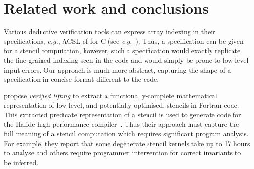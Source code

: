 \documentclass[10pt,preprint]{sigplanconf}
\theoremstyle{definition}
\newcommand{\eg}{\emph{e.g.}}
\begin{document}













\section{Related work and conclusions}
\label{sec:discussion}

Various deductive verification tools can express array indexing
in their specifications, \eg{}, ACSL of \citet{baudin2008acsl}
for C (see \eg{}~\citet[Example 3.4.1]{burghardt2010acsl}). Thus, a specification
can be given for a stencil computation, 
however, such a specification would exactly replicate the fine-grained
indexing seen in the code and would simply be prone to low-level input
errors. Our approach is much more abstract,
capturing the shape of a specification in concise format different to
the code. 

\citet{kamil2016verified} propose \emph{verified lifting} to extract a
functionally-complete mathematical representation of low-level, and
potentially optimised, stencils in Fortran code. This extracted
predicate representation of a stencil is used to generate code
for the \textsf{Halide} high-performance
compiler~\citep{ragan2013halide}. Thus their approach must capture the
full meaning of a stencil computation which requires significant
program analysis. For example, they report that some degenerate
stencil kernels take up to 17 hours to analyse and others require
programmer intervention for correct invariants to be inferred.

\end{document}
